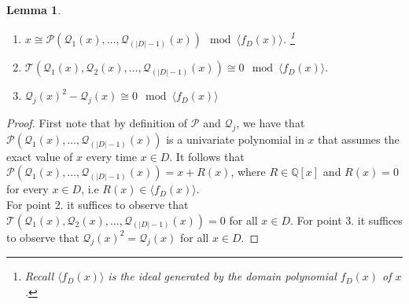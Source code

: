 \documentclass[11pt]{article}
\newcommand{\1}{\textbf{1}}
\newcommand{\Field}{\mathbb{Q}}
\newcommand{\T}{\mathcal{T}}
\newcommand\p{\mathcal{P}}
\newcommand\q{\mathcal{Q}}
\newcommand\uval{{(|D|-1)}}
\newtheorem{lemma}[theorem]{Lemma}
\begin{document}
\begin{lemma}\label{th:x}
    \begin{enumerate}
        \item $x \cong \p(\q_1(x),\ldots,\q_\uval(x)) \mod{\langle f_D(x)\rangle}$. \footnote{Recall $\langle f_D(x)\rangle$ is the ideal generated by the domain polynomial $f_D(x)$ of $x$.}
        \item $\T(\q_1(x), \q_2(x), \dots, \q_{\uval}(x)) \cong 0 \mod{\langle f_D(x)\rangle}.$
        \item $\q_{j}(x)^2 - \q_{j}(x) \cong 0 \mod{\langle f_D(x)\rangle}$
    \end{enumerate}
\end{lemma}
\begin{proof}
    First note that by definition of $\p$ and $\q_j$, we have that $\p(\q_1(x),\ldots,\q_\uval(x))$ is a univariate polynomial in $x$ that assumes the exact value of $x$ every time $x\in D$. It follows that  $\p(\q_1(x),\ldots,\q_\uval(x))= x + R(x)$, where $R\in \Field[x]$ and $R(x)=0$ for every $x\in D$, i.e $R(x)\in \langle f_D(x)\rangle$. \\
    For point 2. it suffices to observe that $\T(\q_1(x), \q_2(x), \dots, \q_{\uval}(x)) = 0$ for all $x \in D$. For point 3. it suffices to observe that $\q_{j}(x)^2 = \q_{j}(x)$ for all $x \in D$.
\end{proof}
\end{document}
